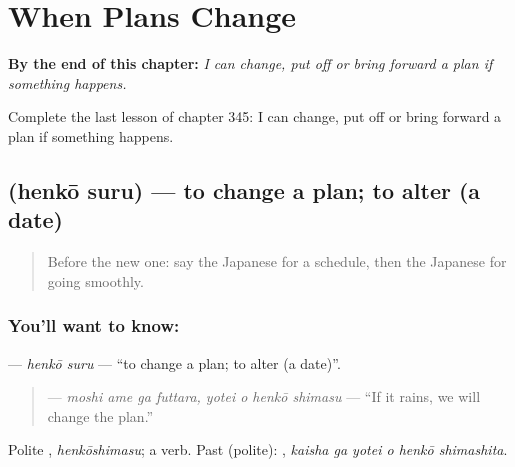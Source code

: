 
\chapter{When Plans Change}
\label{ch:ja-when-plans-change}

\begin{chapteropening}
\textbf{By the end of this chapter:} \emph{I can change, put off or bring forward a plan if something happens.}

Complete the last lesson of chapter 345: I can change, put off or bring forward a plan if something happens.
\end{chapteropening}

\section[\texorpdfstring{\ja{へんこうする} (henkō suru)}{へんこうする (henkō suru)}]{ (henkō suru) — to change a plan; to alter (a date)}

\label{lesson:JA-C345-henkou-suru}



\begin{quote}
Before the new one: say the Japanese for a schedule, then the Japanese for going smoothly.
\end{quote}

\subsection*{You'll want to know: }
\textbf{} — \emph{henkō suru} — \textquotedblleft{}to change a plan; to alter (a date)\textquotedblright{}.

\begin{quote}
\textbf{   } — \emph{moshi ame ga futtara, yotei o henkō shimasu} — \textquotedblleft{}If it rains, we will change the plan.\textquotedblright{}
\end{quote}

Polite \textbf{}, \emph{henkōshimasu}; a  verb. Past (polite): \textbf{  }, \emph{kaisha ga yotei o henkō shimashita}.

